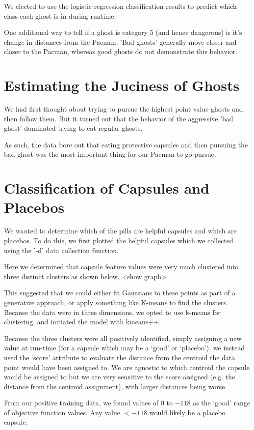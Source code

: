 \documentclass[11pt, oneside]{article}   	%
\begin{document}
We elected to use the logistic regression classification results to predict which class each ghost is in during runtime.

One additional way to tell if a ghost is category 5 (and hence dangerous) is it's change in distances from the Pacman. 'Bad ghosts' generally move closer and closer to the Pacman, whereas good ghosts do not demonstrate this behavior.

\section{Estimating the Juciness of Ghosts}

We had first thought about trying to pursue the highest point value ghosts and then follow them. But it turned out that the behavior of the aggressive 'bad ghost' dominated trying to eat regular ghosts.

As such, the data bore out that eating protective capsules and then pursuing the bad ghost was the most important thing for our Pacman to go pursue.

\section{Classification of Capsules and Placebos}
We wanted to determine which of the pills are helpful capsules and which are placebos. To do this, we first plotted the helpful capsules which we collected using the '-d' data collection function.

Here we determined that capsule feature values were very much clustered into three distinct clusters as shown below.
<show graph>

This suggested that we could either fit Gaussians to these points as part of a generative approach, or apply something like K-means to find the clusters. Because the data were in three dimensions, we opted to use k-means for clustering, and initiated the model with kmeans++.

Because the three clusters were all positively identified, simply assigning a new value at run-time (for a capsule which may be a `good' or `placebo'), we instead used the `score' attribute to evaluate the distance from the centroid the data point would have been assigned to. We are agnostic to which centroid the capsule would be assigned to but we are very sensitive to the score assigned (e.g. the distance from the centroid assignment), with larger distances being worse.

From our positive training data, we found values of $0$ to $-118$ as the `good' range of objective function values. Any value $<-118$ would likely be a placebo capsule.
\end{document}
